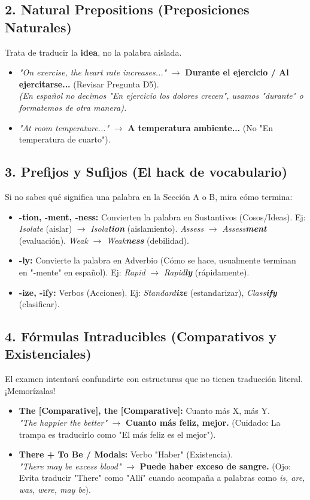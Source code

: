 \documentclass[11pt,a4paper]{article}
\begin{document}
\subsection{2. Natural Prepositions (Preposiciones Naturales)}
Trata de traducir la \textbf{idea}, no la palabra aislada.
\begin{itemize}
    \item \textit{"On exercise, the heart rate increases..."} $\to$ \textbf{Durante el ejercicio / Al ejercitarse...} (Revisar Pregunta D5). \\
    \textit{(En español no decimos "En ejercicio los dolores crecen", usamos "durante" o formatemos de otra manera).}
    \item \textit{"At room temperature..."} $\to$ \textbf{A temperatura ambiente...} (No "En temperatura de cuarto").
\end{itemize}

\subsection{3. Prefijos y Sufijos (El hack de vocabulario)}
Si no sabes qué significa una palabra en la Sección A o B, mira cómo termina:
\begin{itemize}
    \item \textbf{-tion, -ment, -ness:} Convierten la palabra en Sustantivos (Cosos/Ideas). Ej: \textit{Isolate} (aislar) $\to$ \textit{Isola\textbf{tion}} (aislamiento). \textit{Assess} $\to$ \textit{Assess\textbf{ment}} (evaluación). \textit{Weak} $\to$ \textit{Weak\textbf{ness}} (debilidad).
    \item \textbf{-ly:} Convierte la palabra en Adverbio (Cómo se hace, usualmente terminan en "-mente" en español). Ej: \textit{Rapid} $\to$ \textit{Rapid\textbf{ly}} (rápidamente).
    \item \textbf{-ize, -ify:} Verbos (Acciones). Ej: \textit{Standard\textbf{ize}} (estandarizar), \textit{Class\textbf{ify}} (clasificar).
\end{itemize}

\subsection{4. Fórmulas Intraducibles (Comparativos y Existenciales)}
El examen intentará confundirte con estructuras que no tienen traducción literal. ¡Memorízalas!
\begin{itemize}
    \item \textbf{The [Comparative], the [Comparative]:} Cuanto más X, más Y. \\
    \textit{"The happier the better"} $\to$ \textbf{Cuanto más feliz, mejor.} (Cuidado: La trampa es traducirlo como "El más feliz es el mejor").
    \item \textbf{There + To Be / Modals:} Verbo "Haber" (Existencia). \\
    \textit{"There may be excess blood"} $\to$ \textbf{Puede haber exceso de sangre.} (Ojo: Evita traducir "There" como "Allí" cuando acompaña a palabras como \textit{is, are, was, were, may be}).
\end{itemize}
\end{document}
